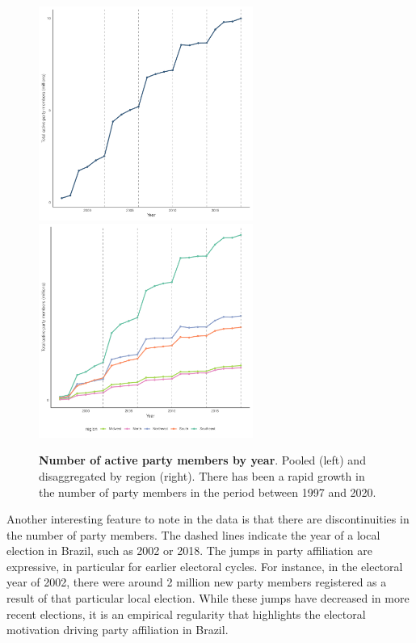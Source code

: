 \documentclass[12pt,a4paper]{article}
\begin{document}
\begin{figure}[H]
    \centering
    \includegraphics[width = 7cm, height = 7cm]{figures/partisanship/plot_partisan_by_year.pdf}
    \includegraphics[width = 7cm, height = 7cm]{figures/partisanship/plot_partisan_by_region.pdf}
    \caption{\textbf{Number of active party members by year}. Pooled (left) and disaggregated by region (right). There has been a rapid growth in the number of party members in the period between 1997 and 2020.}
    \label{fig:number_partisan}
\end{figure}

Another interesting feature to note in the data is that there are discontinuities in the number of party members. The dashed lines indicate the year of a local election in Brazil, such as 2002 or 2018. The jumps in party affiliation are expressive, in particular for earlier electoral cycles. For instance, in the electoral year of 2002, there were around 2 million new party members registered as a result of that particular local election. While these jumps have decreased in more recent elections, it is an empirical regularity that highlights the electoral motivation driving party affiliation in Brazil.
\end{document}
